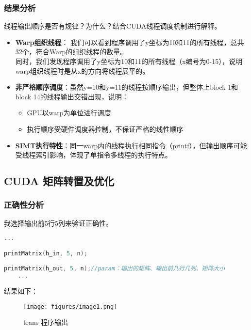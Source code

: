 \documentclass{SYSUReport}
\begin{document}
\subsubsection{结果分析}
线程输出顺序是否有规律？为什么？结合CUDA线程调度机制进行解释。
\begin{itemize}
    \item \textbf{Warp组织线程}： 我们可以看到程序调用了y坐标为10和11的所有线程，总共32个，符合Warp的组织线程的数量。
    \\同时，我们发现程序调用了y坐标为10和11的所有线程（x编号为0-15），说明warp组织线程时是从x的方向将线程展平的。

    \item \textbf{非严格顺序调度}：虽然y=10和y=11的线程按顺序输出，但整体上block 1和block 14的线程输出交错出现，说明：
    \begin{itemize}
        \item GPU以warp为单位进行调度
        \item 执行顺序受硬件调度器控制，不保证严格的线性顺序
    \end{itemize}
    \item \textbf{SIMT执行特性}：同一warp内的线程执行相同指令（printf），但输出顺序可能受线程索引影响，体现了单指令多线程的执行特点。
\end{itemize}
\subsection{CUDA 矩阵转置及优化}
\subsubsection{正确性分析}
我选择输出前5行5列来验证正确性。\\

\begin{lstlisting}[language=c]
    ...

printMatrix(h_in, 5, n);

printMatrix(h_out, 5, n);//param：输出的矩阵、输出前几行几列、矩阵大小
    ...    
\end{lstlisting}
结果如下：
\begin{figure}
    \centering
    \texttt{[image: figures/image1.png]}
    \caption{trans 程序输出}
    \label{fig:trans}
\end{figure}
\end{document}
